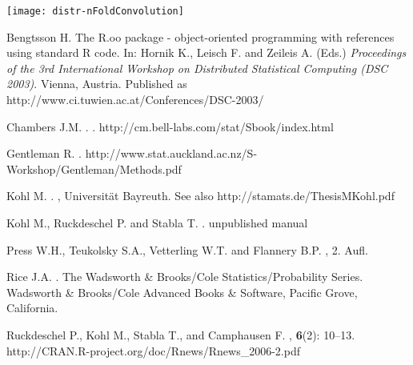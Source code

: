 \documentclass[11pt]{article}
\begin{document}
\texttt{[image: distr-nFoldConvolution]}
\begin{thebibliography}{8}

Bengtsson H.
\newblock The {R.oo} package - object-oriented programming with references using
standard {R} code.
\newblock In: Hornik K., Leisch F. and Zeileis A. (Eds.) {\em
  Proceedings of the 3rd International Workshop on Distributed Statistical
  Computing (DSC 2003)\/}. Vienna, Austria.
\newblock Published as http://www.ci.tuwien.ac.at/Conferences/DSC-2003/

Chambers J.M.
.
.
\newblock http://cm.bell-labs.com/stat/Sbook/index.html

Gentleman R.
.
\newblock http://www.stat.auckland.ac.nz/S-Workshop/Gentleman/Methods.pdf

Kohl M.
.
, Universit\"at Bayreuth.
\newblock See also http://stamats.de/ThesisMKohl.pdf

Kohl M., Ruckdeschel P. and Stabla T.
.
\newblock unpublished manual

Press W.H., Teukolsky S.A., Vetterling W.T. and Flannery B.P.
, 2. Aufl.

Rice J.A.
.
\newblock The Wadsworth \& Brooks/Cole Statistics/Probability Series.
  {Wadsworth \& Brooks/Cole Advanced Books \& Software}, Pacific Grove,
  California.

Ruckdeschel P., Kohl M., Stabla T., and Camphausen F.
, {\bf 6}(2): 10--13.
\newblock http://CRAN.R-project.org/doc/Rnews/Rnews\_2006-2.pdf

\end{thebibliography}
\end{document}
